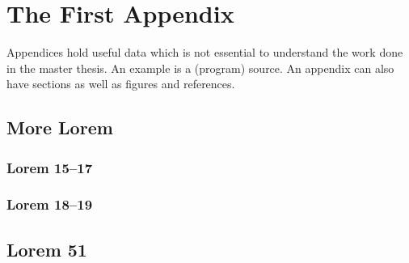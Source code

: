\chapter{The First Appendix}
\label{app:A}
Appendices hold useful data which is not essential to understand the work
done in the master thesis. An example is a (program) source.
An appendix can also have sections as well as figures and references\cite{h2g2}.

\section{More Lorem}
\lipsum[50]

\subsection{Lorem 15--17}
\lipsum[15-17]

\subsection{Lorem 18--19}
\lipsum[18-19]

\section{Lorem 51}
\lipsum[51]

